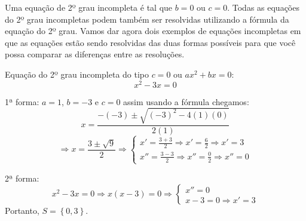 

 Uma equação de 2º grau incompleta é tal que $b=0$ ou $c=0$. Todas as equações do 2º grau incompletas podem também ser resolvidas utilizando a fórmula da equação do 2º grau. Vamos dar agora dois exemplos de equações incompletas em que as equações estão sendo resolvidas das duas formas possíveis para que você possa comparar as diferenças entre as resoluções.

 \begin{exem}
   Equação do 2º grau incompleta do tipo $c=0$ ou $ax^2 + bx = 0$:
\begin{equation*}
x^2 - 3x = 0
\end{equation*}

  1ª forma:  $a = 1$, $b = -3$ e $c = 0$ assim usando a fórmula chegamos:
\begin{equation*}
x = \frac{- (-3) \pm \sqrt{(-3)^2 - 4 (1)(0)}}{2 (1)}
\end{equation*}
  \[\Rightarrow x = \frac{3 \pm \sqrt{9}}{2} \Rightarrow \begin{cases}
     x' = \frac{3 + 3}{2} \Rightarrow x' = \frac{6}{2} \Rightarrow x' = 3 \\
    x'' = \frac{3 - 3}{2} \Rightarrow x''= \frac{0}{2} \Rightarrow x''= 0
    \end{cases}\]

  2ª forma:
  \[x^2 - 3x = 0 \Rightarrow x(x - 3)=0 \Rightarrow \begin{cases}
     x''= 0 \\
     x - 3 = 0 \Rightarrow x' = 3
     \end{cases}\]
 Portanto, $S= \left\{ 0, 3 \right\}$. 
 \end{exem}
 
